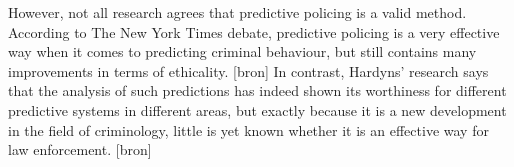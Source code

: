 However, not all research agrees that predictive policing is a valid method. According to The New York Times debate, predictive policing is a very effective way when it comes to predicting criminal behaviour, but still contains many improvements in terms of ethicality. [bron] In contrast, Hardyns' research says that the analysis of such predictions has indeed shown its worthiness for different predictive systems in different areas, but exactly because it is a new development in the field of criminology, little is yet known whether it is an effective way for law enforcement. [bron] 


